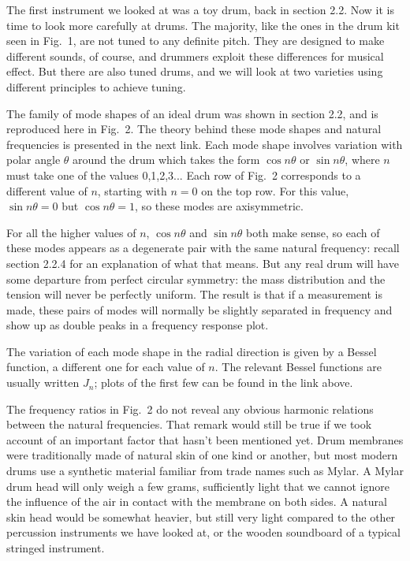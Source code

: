 

  The first instrument we looked at was a toy drum, back in section 2.2. Now it 
  is time to look more carefully at drums. The majority, like the ones in the 
  drum kit seen in Fig.\ 1, are not tuned to any definite pitch. They are 
  designed to make different sounds, of course, and drummers exploit these 
  differences for musical effect. But there are also tuned drums, and we will 
  look at two varieties using different principles to achieve tuning. 


  The family of mode shapes of an ideal drum was shown in section 2.2, and is 
  reproduced here in Fig.\ 2. The theory behind these mode shapes and natural 
  frequencies is presented in the next link. Each mode shape involves variation 
  with polar angle $\theta$ around the drum which takes the form $\cos n 
  \theta$ or $\sin n \theta$, where $n$ must take one of the values 0,1,2,3... 
  Each row of Fig.\ 2 corresponds to a different value of $n$, starting with 
  $n=0$ on the top row. For this value, $\sin n \theta =0$ but $\cos n \theta = 
  1$, so these modes are axisymmetric. 

  For all the higher values of $n$, $\cos n \theta$ and $\sin n \theta$ both 
  make sense, so each of these modes appears as a degenerate pair with the same 
  natural frequency: recall section 2.2.4 for an explanation of what that 
  means. But any real drum will have some departure from perfect circular 
  symmetry: the mass distribution and the tension will never be perfectly 
  uniform. The result is that if a measurement is made, these pairs of modes 
  will normally be slightly separated in frequency and show up as double peaks 
  in a frequency response plot. 

  The variation of each mode shape in the radial direction is given by a Bessel 
  function, a different one for each value of $n$. The relevant Bessel 
  functions are usually written $J_n$; plots of the first few can be found in 
  the link above. 

  The frequency ratios in Fig.\ 2 do not reveal any obvious harmonic relations 
  between the natural frequencies. That remark would still be true if we took 
  account of an important factor that hasn't been mentioned yet. Drum membranes 
  were traditionally made of natural skin of one kind or another, but most 
  modern drums use a synthetic material familiar from trade names such as 
  Mylar. A Mylar drum head will only weigh a few grams, sufficiently light that 
  we cannot ignore the influence of the air in contact with the membrane on 
  both sides. A natural skin head would be somewhat heavier, but still very 
  light compared to the other percussion instruments we have looked at, or the 
  wooden soundboard of a typical stringed instrument. 

